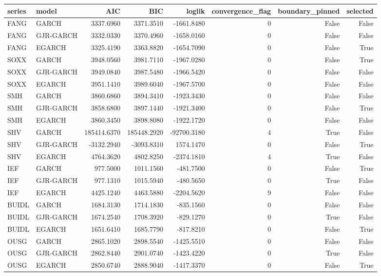 \begin{tabular}{llrrrrrr}
\toprule
series & model & AIC & BIC & loglik & convergence\_flag & boundary\_pinned & selected \\
\midrule
FANG & GARCH & 3337.6960 & 3371.3510 & -1661.8480 & 0 & False & False \\
FANG & GJR-GARCH & 3332.0330 & 3370.4960 & -1658.0160 & 0 & False & False \\
FANG & EGARCH & 3325.4190 & 3363.8820 & -1654.7090 & 0 & False & True \\
SOXX & GARCH & 3948.0560 & 3981.7110 & -1967.0280 & 0 & False & True \\
SOXX & GJR-GARCH & 3949.0840 & 3987.5480 & -1966.5420 & 0 & False & False \\
SOXX & EGARCH & 3951.1410 & 3989.6040 & -1967.5700 & 0 & False & False \\
SMH & GARCH & 3860.6860 & 3894.3410 & -1923.3430 & 0 & False & False \\
SMH & GJR-GARCH & 3858.6800 & 3897.1440 & -1921.3400 & 0 & False & True \\
SMH & EGARCH & 3860.3450 & 3898.8080 & -1922.1720 & 0 & False & False \\
SHV & GARCH & 185414.6370 & 185448.2920 & -92700.3180 & 4 & True & False \\
SHV & GJR-GARCH & -3132.2940 & -3093.8310 & 1574.1470 & 0 & False & True \\
SHV & EGARCH & 4764.3620 & 4802.8250 & -2374.1810 & 4 & True & False \\
IEF & GARCH & 977.5000 & 1011.1560 & -481.7500 & 0 & False & True \\
IEF & GJR-GARCH & 977.1310 & 1015.5940 & -480.5650 & 0 & True & False \\
IEF & EGARCH & 4425.1240 & 4463.5880 & -2204.5620 & 9 & False & False \\
BUIDL & GARCH & 1684.3130 & 1714.1830 & -835.1560 & 0 & False & False \\
BUIDL & GJR-GARCH & 1674.2540 & 1708.3920 & -829.1270 & 0 & True & False \\
BUIDL & EGARCH & 1651.6410 & 1685.7790 & -817.8210 & 0 & False & True \\
OUSG & GARCH & 2865.1020 & 2898.5540 & -1425.5510 & 0 & False & False \\
OUSG & GJR-GARCH & 2862.8440 & 2901.0740 & -1423.4220 & 0 & True & False \\
OUSG & EGARCH & 2850.6740 & 2888.9040 & -1417.3370 & 0 & False & True \\

\end{tabular}
